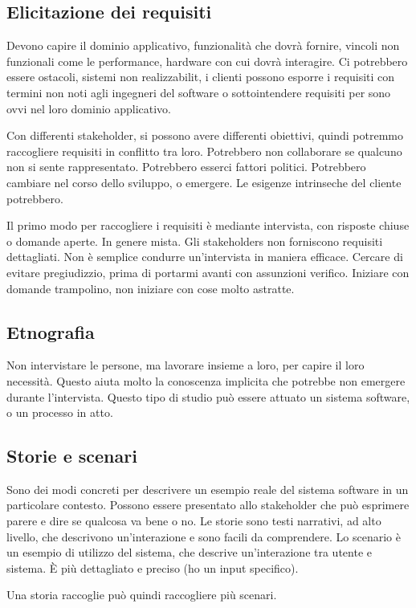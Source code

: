 \subsection{Elicitazione dei requisiti}
Devono capire il dominio applicativo, funzionalità che dovrà fornire, 
vincoli non funzionali come le performance, hardware con cui dovrà interagire.
Ci potrebbero essere ostacoli, sistemi non realizzabilit, 
i clienti possono esporre i requisiti con termini non noti 
agli ingegneri del software o sottointendere requisiti per sono ovvi 
nel loro dominio applicativo.

Con differenti stakeholder, si possono avere differenti obiettivi,
quindi potremmo raccogliere requisiti in conflitto tra loro. 
Potrebbero non collaborare se qualcuno non si sente rappresentato.
Potrebbero esserci fattori politici. Potrebbero cambiare nel corso dello 
sviluppo, o emergere. Le esigenze intrinseche del cliente potrebbero.

Il primo modo per raccogliere i requisiti è mediante 
intervista, con risposte chiuse o domande aperte. In genere mista. Gli stakeholders 
non forniscono requisiti dettagliati. Non è semplice condurre un'intervista in 
maniera efficace. 
Cercare di evitare pregiudizzio, prima di portarmi avanti con assunzioni verifico.
Iniziare con domande trampolino, non iniziare con cose molto astratte.

\subsection{Etnografia}
Non intervistare le persone, ma lavorare insieme a loro, per capire il loro
necessità. Questo aiuta molto la conoscenza implicita che potrebbe non emergere 
durante l'intervista. Questo tipo di studio può essere attuato un sistema software, 
o un processo in atto.
\subsection{Storie e scenari}
Sono dei modi concreti per descrivere un esempio reale del sistema software in 
un particolare contesto. Possono essere presentato allo stakeholder che può 
esprimere parere e dire se qualcosa va bene o no.
Le storie sono testi narrativi, ad alto livello, che descrivono un'interazione
e sono facili da comprendere.
Lo scenario è un esempio di utilizzo del sistema, che descrive un'interazione
tra utente e sistema. È più dettagliato e preciso (ho un input specifico).

Una storia raccoglie può quindi raccogliere più scenari.

